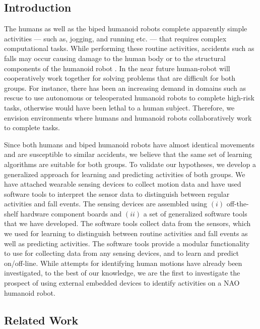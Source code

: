 \documentclass[letterpaper]{article}
\begin{document}
\begin{sloppy}
\section{Introduction}
\label{sec:Intro}
The humans as well as the biped humanoid robots complete apparently simple activities --- such as, jogging, and running etc. --- that requires 
complex computational tasks. While performing these routine 
activities, accidents such as falls may occur causing damage to the human body or to the structural 
components of the humanoid robot \cite{li2009accurate}. In the near future human-robot will cooperatively work together for solving problems that are difficult for both groups.  For instance, there has been an increasing demand in 
domains such as rescue to use autonomous or teleoperated humanoid robots to complete high-risk 
tasks, otherwise would have been lethal to a human subject. Therefore, we envision environments 
where humans and humanoid robots collaboratively work to complete tasks. 

Since both humans and biped humanoid robots have almost identical movements and are susceptible to 
similar accidents, we believe that the same set of learning algorithms are suitable for both 
groups. To validate our hypotheses, we develop a generalized approach for learning 
and predicting activities of both groups.  We have attached wearable sensing devices to collect 
motion data and have used software tools to interpret the sensor data to distinguish 
between regular activities and fall events. The sensing devices are assembled using $(i)$ off-the-shelf 
hardware component boards and $(ii)$  a set of generalized software tools that we have developed. The software tools 
collect data  from the sensors, which we used for learning to distinguish between routine activities and fall events as well as predicting activities. The software tools provide a modular 
functionality to use for collecting  data from any sensing devices, and to learn and predict 
on/off-line. While attempts for identifying human motions have already been investigated, to the 
best of our knowledge, we are the first to investigate the prospect of using external embedded 
devices to identify activities on a NAO humanoid robot. 



\subsection{Related Work}


\end{sloppy}
\end{document}
